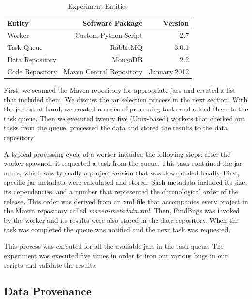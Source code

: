\documentclass[conference]{llncs}
\begin{document}
\begin{table}
\centering
\begin{threeparttable}
\caption{Experiment Entities}
\label{tbl:exp}
\begin{tabular}{l r r}
\hline
Entity & Software Package & Version\\
\hline
Worker & Custom Python Script & 2.7\\
Task Queue & RabbitMQ & 3.0.1 \\
Data Repository & MongoDB & 2.2 \\
Code Repository & Maven Central Repository & January 2012 \\
\hline
\end{tabular}
\end{threeparttable}
\end{table}

First, we scanned the Maven repository for appropriate {\sc jar}s and created a
list that included them. We discuss the {\sc jar} selection process in the next 
section. With the {\sc jar} list at hand, we created a series of processing tasks
and added them to the task queue. Then we executed twenty five (Unix-based)
workers that checked out tasks from the queue, processed the data and stored the
results to the data repository.

A typical processing cycle of a worker included the following steps: after
the worker spawned, it requested a task from the queue. This task contained
the {\sc jar} name, which was typically a project version that was downloaded locally.
First, specific {\sc jar} metadata were calculated and stored. Such metadata included
its size, its dependencies, and a number that represented the chronological order of the
release. This order was derived from an {\sc xml} file that
accompanies every project in the Maven repository called {\it
maven-metadata.xml}. Then, FindBugs was invoked by the worker and its results were
also stored in the data repository. When the task was completed the queue
was notified and the next task was requested.

This process was executed for all the available {\sc jar}s in the task queue.
The experiment was executed five times in order to iron out various bugs in
our scripts and validate the results. 

\subsection{Data Provenance}
\label{sec:data}
\end{document}
